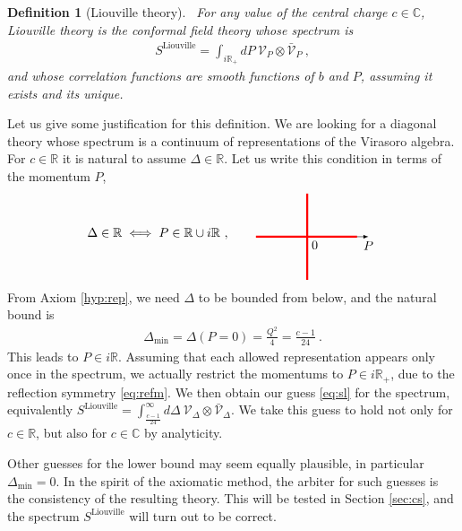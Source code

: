 \documentclass[12pt, a4paper]{article}
\theoremstyle{break}
\newtheorem{defn}[exo]{Definition}
\begin{document}
\begin{defn}[Liouville theory]
 ~\label{def:liou}
 For any value of the central charge $c\in\mathbb{C}$, Liouville theory is the conformal field theory whose spectrum is 
 \begin{align}
  S^\mathrm{Liouville} 
= \int_{i\mathbb{R}_+}  dP\ \mathcal V_P \otimes 
   \bar{\mathcal V}_P\ , 
   \label{eq:sl}
 \end{align}
and whose correlation functions are smooth functions of $b$ and $P$, assuming it exists and its unique.
\end{defn}
Let us give some justification for this definition. We are looking for a diagonal theory whose spectrum is a continuum of representations of the Virasoro algebra. For $c\in \mathbb{R}$ it is natural to assume $\Delta\in \mathbb{R}$. Let us write this condition in terms of the momentum $P$,
\begin{align}
 \Delta \in \mathbb{R} \iff P\in \mathbb{R} \cup i\mathbb{R}\ ,
  \qquad
   \begin{tikzpicture}[scale = .4, baseline=(current  bounding  box.center)]
   \draw[-latex] (-1.6, 0)  -- (2, 0) node[below right] {$0$} -- (4, 0)  -- (6.3, 0) node[below] {$P$};
  \draw[red, ultra thick] (-1.6, 0) -- (5.5, 0);
  \draw[red, ultra thick] (2, -3) -- (2, 3);
 \end{tikzpicture}
\end{align}
From Axiom \ref{hyp:rep}, 
we need $\Delta$ to be bounded from below, and the natural bound is 
\begin{align}
 \Delta_\text{min}=\Delta\left(P=0\right) = \frac{Q^2}{4}=\frac{c-1}{24}\ .
\end{align}
This leads to $P \in i\mathbb{R}$. Assuming that each allowed representation appears only once in the spectrum, we actually restrict the momentums to $P \in i\mathbb{R}_+$, due to the reflection symmetry \eqref{eq:refm}.
We then obtain our guess \eqref{eq:sl} for the spectrum, equivalently $S^\mathrm{Liouville} 
= \int_{\frac{c-1}{24}}^\infty d\Delta\ \mathcal V_{\Delta}\otimes \bar{\mathcal{V}}_\Delta $.
We take this guess to hold not only for $c\in\mathbb{R}$, but also for $c\in\mathbb{C}$ by analyticity.

\begin{tcolorbox}
Other guesses for the lower bound may seem equally plausible, in particular $\Delta_\text{min}=0$. In the spirit of the axiomatic method, the arbiter for such guesses is the consistency of the resulting theory. 
This will be tested in Section \ref{sec:cs}, and the spectrum $S^\mathrm{Liouville}$ will turn out to be correct.
\end{tcolorbox}
\end{document}
